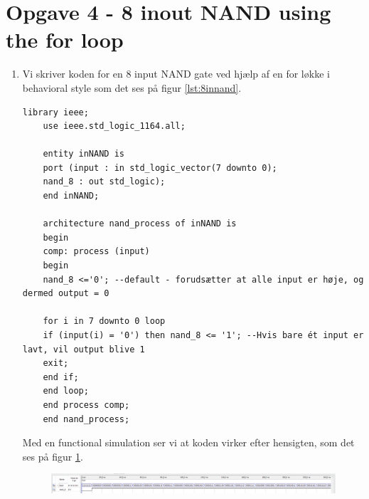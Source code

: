 \section{Opgave 4 - 8 inout NAND using the for loop}
\begin{enumerate}
	\item[1)]
	Vi skriver koden for en 8 input NAND gate ved hjælp af en for løkke i behavioral style som det ses på figur \ref{lst:8innand}.\\
	\begin{lstlisting}[caption={Behavioral style kode en 8 input NAND gate},label={lst:8innand}]
	library ieee;
	use ieee.std_logic_1164.all;
	
	entity inNAND is
	port (input : in std_logic_vector(7 downto 0);
	nand_8 : out std_logic);
	end inNAND;
	
	architecture nand_process of inNAND is
	begin
	comp: process (input)
	begin
	nand_8 <='0'; --default - forudsætter at alle input er høje, og dermed output = 0
	
	for i in 7 downto 0 loop
	if (input(i) = '0') then nand_8 <= '1'; --Hvis bare ét input er lavt, vil output blive 1
	exit;
	end if;
	end loop;
	end process comp;
	end nand_process;
	\end{lstlisting}
	Med en functional simulation ser vi at koden virker efter hensigten, som det ses på figur \ref{fig:8innand}.\\
	\begin{figure}[h]
		\centering
		\includegraphics[scale=0.8]{pictures/Oevelse5/opg4/func_sim_8nand.JPG}
		\caption{}
		\label{fig:8innand}
	\end{figure}
\end{enumerate}